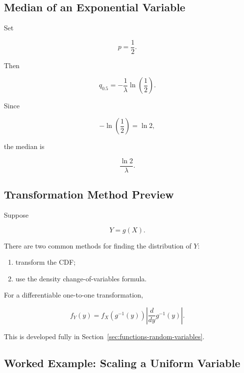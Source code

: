 \subsection{Median of an Exponential Variable}
\label{subsec:exponential-median}

Set

\[
p=\frac12.
\]

Then

\[
q_{0.5}
=
-\frac1\lambda
\ln\left(\frac12\right).
\]

Since

\[
-\ln\left(\frac12\right)
=
\ln2,
\]

the median is

\[
\boxed{
\frac{\ln2}{\lambda}.
}
\]

\subsection{Transformation Method Preview}
\label{subsec:continuous-transformation-method-preview}

Suppose

\[
Y=g(X).
\]

There are two common methods for finding the distribution of \(Y\):

\begin{enumerate}
    \item transform the CDF;
    \item use the density change-of-variables formula.
\end{enumerate}

For a differentiable one-to-one transformation,

\[
\boxed{
f_Y(y)
=
f_X(g^{-1}(y))
\left|
\frac{d}{dy}
g^{-1}(y)
\right|.
}
\]

This is developed fully in Section~\ref{sec:functions-random-variables}.

\subsection{Worked Example: Scaling a Uniform Variable}
\label{subsec:worked-uniform-scaling}

